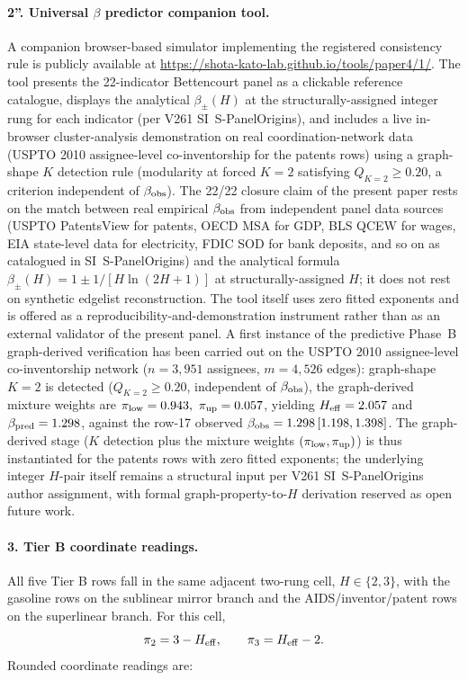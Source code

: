 \paragraph{2''. Universal \(\beta\) predictor companion tool.}
A companion browser-based simulator implementing the registered consistency rule is publicly available at \url{https://shota-kato-lab.github.io/tools/paper4/1/}. The tool presents the 22-indicator Bettencourt panel as a clickable reference catalogue, displays the analytical \(\beta_{\pm}(H)\) at the structurally-assigned integer rung for each indicator (per V261 SI~\textsf{S-PanelOrigins}), and includes a live in-browser cluster-analysis demonstration on real coordination-network data (USPTO 2010 assignee-level co-inventorship for the patents rows) using a graph-shape \(K\) detection rule (modularity at forced \(K{=}2\) satisfying \(Q_{K=2}\ge 0.20\), a criterion independent of \(\beta_{\rm obs}\)). The 22/22 closure claim of the present paper rests on the match between real empirical \(\beta_{\rm obs}\) from independent panel data sources (USPTO PatentsView for patents, OECD MSA for GDP, BLS QCEW for wages, EIA state-level data for electricity, FDIC SOD for bank deposits, and so on as catalogued in SI~\textsf{S-PanelOrigins}) and the analytical formula \(\beta_{\pm}(H)=1\pm 1/[H\ln(2H+1)]\) at structurally-assigned \(H\); it does not rest on synthetic edgelist reconstruction. The tool itself uses zero fitted exponents and is offered as a reproducibility-and-demonstration instrument rather than as an external validator of the present panel. A first instance of the predictive Phase~B graph-derived verification has been carried out on the USPTO 2010 assignee-level co-inventorship network (\(n=3{,}951\) assignees, \(m=4{,}526\) edges): graph-shape \(K{=}2\) is detected (\(Q_{K=2}\ge 0.20\), independent of \(\beta_{\rm obs}\)), the graph-derived mixture weights are \(\pi_{\rm low}=0.943,\ \pi_{\rm up}=0.057\), yielding \(H_{\rm eff}=2.057\) and \(\beta_{\rm pred}=1.298\), against the row-17 observed \(\beta_{\rm obs}=1.298\,[1.198,1.398]\). The graph-derived stage (\(K\) detection plus the mixture weights \((\pi_{\rm low},\pi_{\rm up})\)) is thus instantiated for the patents rows with zero fitted exponents; the underlying integer \(H\)-pair itself remains a structural input per V261 SI~\textsf{S-PanelOrigins} author assignment, with formal graph-property-to-\(H\) derivation reserved as open future work.

\paragraph{3. Tier B coordinate readings.}
All five Tier B rows fall in the same adjacent two-rung cell, \(H\in\{2,3\}\), with the gasoline rows on the sublinear mirror branch and the AIDS/inventor/patent rows on the superlinear branch. For this cell,
\[
\pi_2=3-H_{\rm eff},\qquad \pi_3=H_{\rm eff}-2 .
\]
Rounded coordinate readings are:

